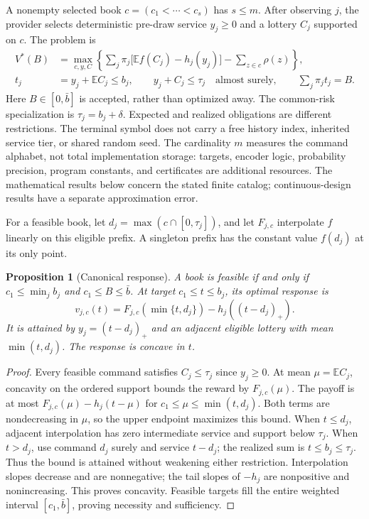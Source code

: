 \documentclass[11pt,letterpaper]{article}
\newtheorem{proposition}[theorem]{Proposition}
\theoremstyle{definition}\newtheorem{remark}[theorem]{Remark}
\begin{document}
A nonempty selected book $c=(c_1<\cdots<c_s)$ has $s\leq m$. After observing $j$, the provider selects deterministic pre-draw service $y_j\geq0$ and a lottery $C_j$ supported on $c$. The problem is
\begin{align}
 V^*(B)&=\max_{c,y,C}\left\{\sum_j\pi_j\bigl[\mathbb E f(C_j)-h_j(y_j)\bigr]-\sum_{z\in c}\rho(z)\right\},\label{eq:original52}\\
 t_j&=y_j+\mathbb E C_j\leq b_j,\qquad y_j+C_j\leq\tau_j\quad\text{almost surely},\qquad \sum_j\pi_jt_j=B.\label{eq:constraints52}
\end{align}
Here $B\in[0,\bar b]$ is accepted, rather than optimized away. The common-risk specialization is $\tau_j=b_j+\delta$. Expected and realized obligations are different restrictions. The terminal symbol does not carry a free history index, inherited service tier, or shared random seed. The cardinality $m$ measures the command alphabet, not total implementation storage: targets, encoder logic, probability precision, program constants, and certificates are additional resources. The mathematical results below concern the stated finite catalog; continuous-design results have a separate approximation error.

For a feasible book, let $d_j=\max(c\cap[0,\tau_j])$, and let $F_{j,c}$ interpolate $f$ linearly on this eligible prefix. A singleton prefix has the constant value $f(d_j)$ at its only point.
\begin{proposition}[Canonical response]\label{prop:canonical52}
A book is feasible if and only if $c_1\leq\min_jb_j$ and $c_1\leq B\leq\bar b$. At target $c_1\leq t\leq b_j$, its optimal response is
\begin{equation}\label{eq:canonical52}
 v_{j,c}(t)=F_{j,c}(\min\{t,d_j\})-h_j((t-d_j)_+).
\end{equation}
It is attained by $y_j=(t-d_j)_+$ and an adjacent eligible lottery with mean $\min(t,d_j)$. The response is concave in $t$.
\end{proposition}
\begin{proof}
Every feasible command satisfies $C_j\leq\tau_j$ since $y_j\geq0$. At mean $\mu=\mathbb E C_j$, concavity on the ordered support bounds the reward by $F_{j,c}(\mu)$. The payoff is at most $F_{j,c}(\mu)-h_j(t-\mu)$ for $c_1\leq\mu\leq\min(t,d_j)$. Both terms are nondecreasing in $\mu$, so the upper endpoint maximizes this bound. When $t\leq d_j$, adjacent interpolation has zero intermediate service and support below $\tau_j$. When $t>d_j$, use command $d_j$ surely and service $t-d_j$; the realized sum is $t\leq b_j\leq\tau_j$. Thus the bound is attained without weakening either restriction. Interpolation slopes decrease and are nonnegative; the tail slopes of $-h_j$ are nonpositive and nonincreasing. This proves concavity. Feasible targets fill the entire weighted interval $[c_1,\bar b]$, proving necessity and sufficiency.
\end{proof}
\end{document}
